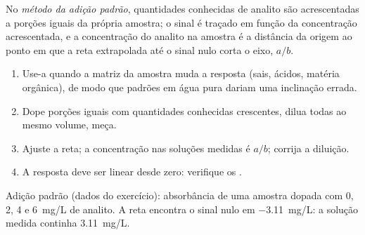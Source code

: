 \begin{definition}\label{def:b2:measurement-statistics:standard-addition}
No \emph{método da adição padrão}, quantidades conhecidas de analito são
acrescentadas a porções iguais da própria amostra; o sinal é traçado em função da concentração
acrescentada, e a concentração do analito na amostra é a distância da origem ao ponto em que a reta
extrapolada até o sinal nulo corta o eixo, $a/b$.
\end{definition}

\begin{method}\label{met:b2:measurement-statistics:standard-addition}
\begin{enumerate}
  \item Use-a quando a matriz da amostra muda a resposta (sais, ácidos, matéria orgânica), de modo que
        padrões em água pura dariam uma inclinação errada.
  \item Dope porções iguais com quantidades conhecidas crescentes, dilua todas ao mesmo volume, meça.
  \item Ajuste a reta; a concentração nas soluções medidas é $a/b$; corrija a diluição.
  \item A resposta deve ser linear desde zero: verifique os .
\end{enumerate}
\end{method}

\begin{omfigure}

{\small Adição padrão (dados do exercício): absorbância de uma amostra dopada com 0, 2, 4 e
\qty{6}{mg/L} de analito. A reta encontra o sinal nulo em \qty{-3.11}{mg/L}: a solução medida
continha \qty{3.11}{mg/L}.}
\end{omfigure}

